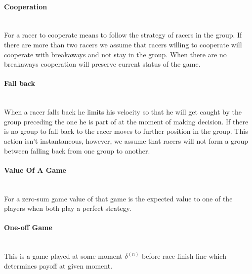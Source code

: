 \documentclass[10pt, a4paper]{report}
\begin{document}
\paragraph{Cooperation} ~\\
For a racer to cooperate means to follow the strategy of racers in the group. If there are more than two racers we assume that racers willing to cooperate will cooperate with breakaways and not stay in the group. When there are no breakaways cooperation will preserve current status of the game.

\paragraph{Fall back} ~\\
When a racer falls back he limits his velocity so that he will get caught by the group preceding the one he is part of at the moment of making decision. If there is no group to fall back to the racer moves to further position in the group. This action isn't instantaneous, however, we assume that racers will not form a group between falling back from one group to another.

\paragraph{Value Of A Game} ~\\
For a zero-sum game value of that game is the expected value to one of the players when both play a perfect strategy.

\paragraph{One-off Game} ~\\
This is a game played at some moment $\delta^{(n)}$ before race finish line which determines payoff at given moment.
\end{document}

